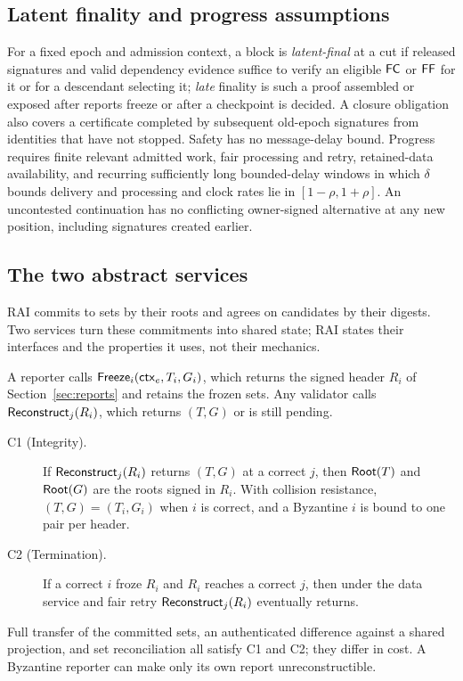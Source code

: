 \subsection{Latent finality and progress assumptions}
For a fixed epoch and admission context, a block is \emph{latent-final} at a cut if released signatures and valid dependency evidence suffice to verify an eligible $\mathsf{FC}$ or $\mathsf{FF}$ for it or for a descendant selecting it; \emph{late} finality is such a proof assembled or exposed after reports freeze or after a checkpoint is decided. A closure obligation also covers a certificate completed by subsequent old-epoch signatures from identities that have not stopped. Safety has no message-delay bound. Progress requires finite relevant admitted work, fair processing and retry, retained-data availability, and recurring sufficiently long bounded-delay windows in which $\delta$ bounds delivery and processing and clock rates lie in $[1-\rho,1+\rho]$. An uncontested continuation has no conflicting owner-signed alternative at any new position, including signatures created earlier.

\subsection{The two abstract services}
\label{sec:services}
RAI commits to sets by their roots and agrees on candidates by their digests. Two services turn these commitments into shared state; RAI states their interfaces and the properties it uses, not their mechanics.

A reporter calls $\mathsf{Freeze}_i(\mathsf{ctx}_e,T_i,G_i)$, which returns the signed header $R_i$ of Section~\ref{sec:reports} and retains the frozen sets. Any validator calls $\mathsf{Reconstruct}_j(R_i)$, which returns $(T,G)$ or is still pending.
\begin{description}
\item[C1 (Integrity).] If $\mathsf{Reconstruct}_j(R_i)$ returns $(T,G)$ at a correct $j$, then $\mathsf{Root}(T)$ and $\mathsf{Root}(G)$ are the roots signed in $R_i$. With collision resistance, $(T,G)=(T_i,G_i)$ when $i$ is correct, and a Byzantine $i$ is bound to one pair per header.
\item[C2 (Termination).] If a correct $i$ froze $R_i$ and $R_i$ reaches a correct $j$, then under the data service and fair retry $\mathsf{Reconstruct}_j(R_i)$ eventually returns.
\end{description}
Full transfer of the committed sets, an authenticated difference against a shared projection, and set reconciliation all satisfy C1 and C2; they differ in cost. A Byzantine reporter can make only its own report unreconstructible.


